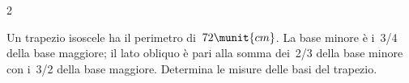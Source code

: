 \begin{htmulticols}{2}
% 
% 
% 
% 
\begin{esercizio}[*]
\label{ese:22.110}
Un trapezio isoscele ha il perimetro di~\(72\munit{cm}\). 
La base minore è i~3/4 della base maggiore; il lato obliquo è pari alla 
somma dei~2/3 della base minore con i~3/2 della base maggiore. 
Determina le misure delle basi del trapezio.
\end{esercizio}
% 
% 
% 

\end{htmulticols}
